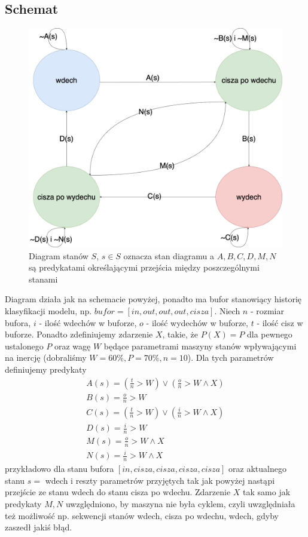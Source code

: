 \documentclass[polish]{article}
\begin{document}
\subsection{Schemat}
\begin{figure}[H]
	\centering
	\includegraphics[width=13cm]{dstanow}
	\caption{Diagram stanów $S$, $s \in S$ oznacza stan diagramu a $A, B, C, D, M, N$ są predykatami określającymi przejścia między poszczególnymi stanami}
\end{figure}
Diagram działa jak na schemacie powyżej, ponadto ma bufor stanowiący historię klasyfikacji modelu, np. $bufor = [in, out, out, out, cisza]$. Niech $n$ - rozmiar bufora,
$i$ - ilość wdechów w buforze, $o$ - ilość wydechów w buforze, $t$ - ilość cisz w buforze. Ponadto zdefiniujemy zdarzenie $X$, takie, że $P(X) = P$ dla pewnego ustalonego $P$
oraz wagę $W$ będące parametrami maszyny stanów wpływającymi na inercję (dobraliśmy $W = 60\%, P=70\%, n = 10$). Dla tych parametrów definiujemy predykaty
\begin{gather*}
	A(s) = (\frac{t}{n} > W) \lor (\frac{o}{n} > W \land X) \\
	B(s) = \frac{o}{n} > W \\
	C(s) =  (\frac{t}{n} > W) \lor (\frac{i}{n} > W \land X) \\
	D(s) = \frac{i}{n} > W \\
	M(s) = \frac{o}{n} > W \land X \\
	N(s) = \frac{i}{n} > W \land X
\end{gather*}
przykładowo dla stanu bufora $[in,cisza, cisza, cisza, cisza]$ oraz aktualnego stanu $s =$ wdech i reszty parametrów przyjętych tak jak powyżej nastąpi przejście
ze stanu wdech do stanu cisza po wdechu. Zdarzenie $X$ tak samo jak predykaty $M, N$ uwzględniono, by maszyna nie była cyklem, czyli uwzględniała też możliwość np. sekwencji stanów
wdech, cisza po wdechu, wdech, gdyby zaszedł jakiś błąd.
\end{document}
